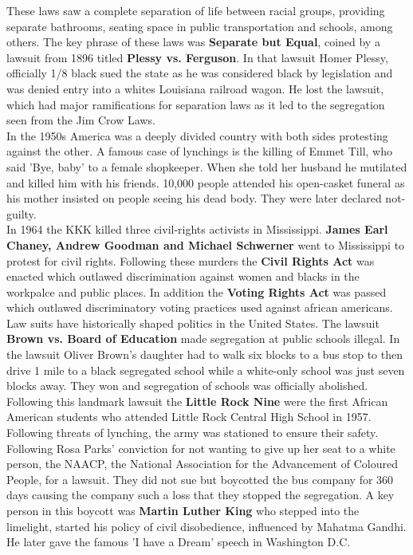 \documentclass{article}
\begin{document}
	These laws saw a complete separation of life between racial groups, providing separate bathrooms, seating space in public transportation and schools, among others. The key phrase of these laws was \textbf{Separate but Equal}, coined by a lawsuit from 1896 titled \textbf{Plessy vs. Ferguson}. In that lawsuit Homer Plessy, officially 1/8 black sued the state as he was considered black by legislation and was denied entry into a whites Louisiana railroad wagon. He lost the lawsuit, which had major ramifications for separation laws as it led to the segregation seen from the Jim Crow Laws. \\
	In the 1950s America was a deeply divided country with both sides protesting against the other. A famous case of lynchings is the killing of Emmet Till, who said 'Bye, baby' to a female shopkeeper. When she told her husband he mutilated and killed him with his friends. 10,000 people attended his open-casket funeral as his mother insisted on people seeing his dead body. They were later declared not-guilty. \\
	In 1964 the KKK killed three civil-rights activists in Mississippi. \textbf{James Earl Chaney, Andrew Goodman and Michael Schwerner} went to Mississippi to protest for civil rights. Following these murders the \textbf{Civil Rights Act} was enacted which outlawed discrimination against women and blacks in the workpalce and public places. In addition the \textbf{Voting Rights Act} was passed which outlawed discriminatory voting practices used against african americans. \\
	Law suits have historically shaped politics in the United States. The lawsuit \textbf{Brown vs. Board of Education} made segregation at public schools illegal. In the lawsuit Oliver Brown's daughter had to walk six blocks to a bus stop to then drive 1 mile to a black segregated school while a white-only school was just seven blocks away. They won and segregation of schools was officially abolished. \\
	Following this landmark lawsuit the \textbf{Little Rock Nine} were the first African American students who attended Little Rock Central High School in 1957. Following threats of lynching, the army was stationed to ensure their safety. \\
	Following Rosa Parks' conviction for not wanting to give up her seat to a white person, the NAACP, the National Association for the Advancement of Coloured People, for a lawsuit. They did not sue but boycotted the bus company for 360 days causing the company such a loss that they stopped the segregation. A key person in this boycott was \textbf{Martin Luther King} who stepped into the limelight, started his policy of civil disobedience, influenced by Mahatma Gandhi. He later gave the famous 'I have a Dream' speech in Washington D.C. \\
\end{document}
